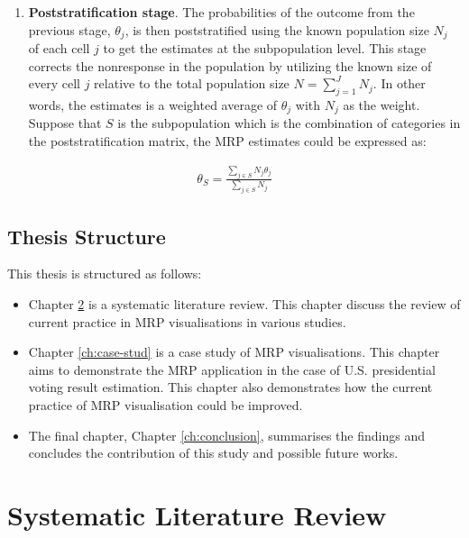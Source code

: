 \documentclass{monashthesis}
\begin{document}
\begin{enumerate}
\def\labelenumi{\arabic{enumi}.}
\setcounter{enumi}{1}
\tightlist
\item
  \textbf{Poststratification stage}. The probabilities of the outcome from the previous stage, \(\theta_j\), is then poststratified using the known population size \(N_j\) of each cell \(j\) to get the estimates at the subpopulation level. This stage corrects the nonresponse in the population by utilizing the known size of every cell \(j\) relative to the total population size \(N = \sum_{j=1}^J N_j\). In other words, the estimates is a weighted average of \(\theta_j\) with \(N_j\) as the weight. Suppose that \(S\) is the subpopulation which is the combination of categories in the poststratification matrix, the MRP estimates could be expressed as:
\end{enumerate}

\begin{equation} 
\begin{split}
\theta_S = \frac{\sum_{j \in S}N_j\theta_j}{\sum_{j\in S}N_j}
\end{split}
\label{eq:mrp-stage2}
\end{equation}

\hypertarget{thesis-structure}{%
\section{Thesis Structure}\label{thesis-structure}}

This thesis is structured as follows:

\begin{itemize}
\item
  Chapter \ref{ch:syslitrev} is a systematic literature review. This chapter discuss the review of current practice in MRP visualisations in various studies.
\item
  Chapter \ref{ch:case-stud} is a case study of MRP visualisations. This chapter aims to demonstrate the MRP application in the case of U.S. presidential voting result estimation. This chapter also demonstrates how the current practice of MRP visualisation could be improved.
\item
  The final chapter, Chapter \ref{ch:conclusion}, summarises the findings and concludes the contribution of this study and possible future works.
\end{itemize}

\hypertarget{ch:syslitrev}{%
\chapter{Systematic Literature Review}\label{ch:syslitrev}}
\end{document}
